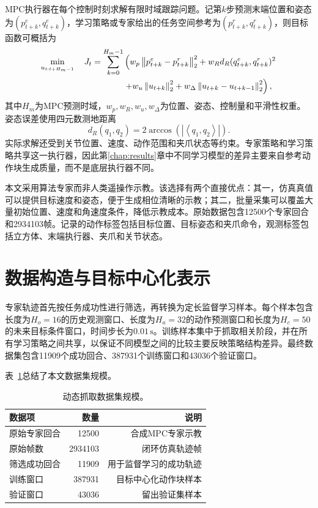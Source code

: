 MPC执行器在每个控制时刻求解有限时域跟踪问题。记第$k$步预测末端位置和姿态为$(p^e_{t+k},q^e_{t+k})$，学习策略或专家给出的任务空间参考为$(p^r_{t+k},q^r_{t+k})$，则目标函数可概括为
\begin{align}
    \min_{u_{t:t+H_m-1}}\quad
    J_t = \sum_{k=0}^{H_m-1} &\left(
        w_p\left\|p^e_{t+k}-p^r_{t+k}\right\|_2^2
        + w_R d_R(q^e_{t+k},q^r_{t+k})^2 \right. \notag \\
        &\left. + w_u\left\|u_{t+k}\right\|_2^2
        + w_\Delta\left\|u_{t+k}-u_{t+k-1}\right\|_2^2
    \right),
    \label{eq:mpc-objective}
\end{align}
其中$H_m$为MPC预测时域，$w_p,w_R,w_u,w_\Delta$为位置、姿态、控制量和平滑性权重。姿态误差使用四元数测地距离
\begin{equation}
    d_R(q_1,q_2)=2\arccos\left(\left|\left\langle q_1,q_2\right\rangle\right|\right).
    \label{eq:quat-distance}
\end{equation}
实际求解还受到关节位置、速度、动作范围和夹爪状态等约束。专家策略和学习策略共享这一执行器，因此第\ref{chap:results}章中不同学习模型的差异主要来自参考动作块生成质量，而不是底层执行器不同。

本文采用算法专家而非人类遥操作示教。该选择有两个直接优点：其一，仿真真值可以提供目标速度和姿态，便于生成相位清晰的示教；其二，批量采集可以覆盖大量初始位置、速度和角速度条件，降低示教成本。原始数据包含12500个专家回合和2934103帧。记录的动作标签包括目标位置、目标姿态和夹爪命令，观测标签包括立方体、末端执行器、夹爪和关节状态。

\section{数据构造与目标中心化表示}

专家轨迹首先按任务成功性进行筛选，再转换为定长监督学习样本。每个样本包含长度为$H_o=16$的历史观测窗口、长度为$H_a=32$的动作预测窗口和长度为$H_c=50$的未来目标条件窗口，时间步长为$0.01\,\mathrm{s}$。训练样本集中于抓取相关阶段，并在所有学习策略之间共享，以保证不同模型之间的比较主要反映策略结构差异。最终数据集包含11909个成功回合、387931个训练窗口和43036个验证窗口。

表~\ref{tab:dataset-summary}总结了本文数据集规模。

\begin{table}[!htbp]
    \caption{动态抓取数据集规模。}
    \label{tab:dataset-summary}
    \centering
    \small
    \begin{tabular}{lrr}
        \hline
        数据项 & 数量 & 说明 \\
        \hline
        原始专家回合 & 12500 & 合成MPC专家示教 \\
        原始帧数 & 2934103 & 闭环仿真轨迹帧 \\
        筛选成功回合 & 11909 & 用于监督学习的成功轨迹 \\
        训练窗口 & 387931 & 目标中心化动作块样本 \\
        验证窗口 & 43036 & 留出验证集样本 \\
        \hline
    \end{tabular}
\end{table}


